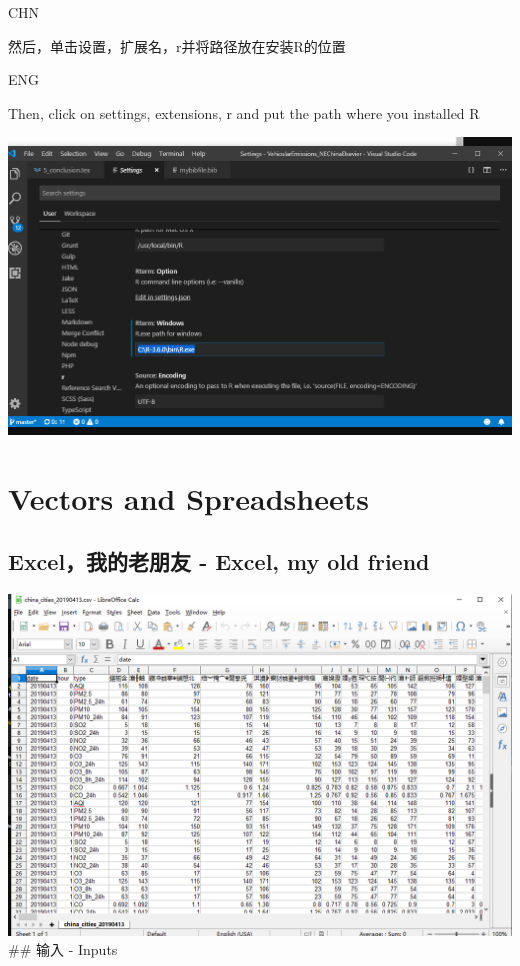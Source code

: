 \documentclass[]{book}
\begin{document}
CHN

然后，单击设置，扩展名，r并将路径放在安装R的位置

ENG

Then, click on settings, extensions, r and put the path where you installed R

\includegraphics{fig/06.png}

\hypertarget{vectors-and-spreadsheets}{%
\chapter{Vectors and Spreadsheets}\label{vectors-and-spreadsheets}}

\hypertarget{excel---excel-my-old-friend}{%
\section{Excel，我的老朋友 - Excel, my old friend}\label{excel---excel-my-old-friend}}

\includegraphics{fig/07.png}
\#\# 输入 - Inputs
\end{document}
